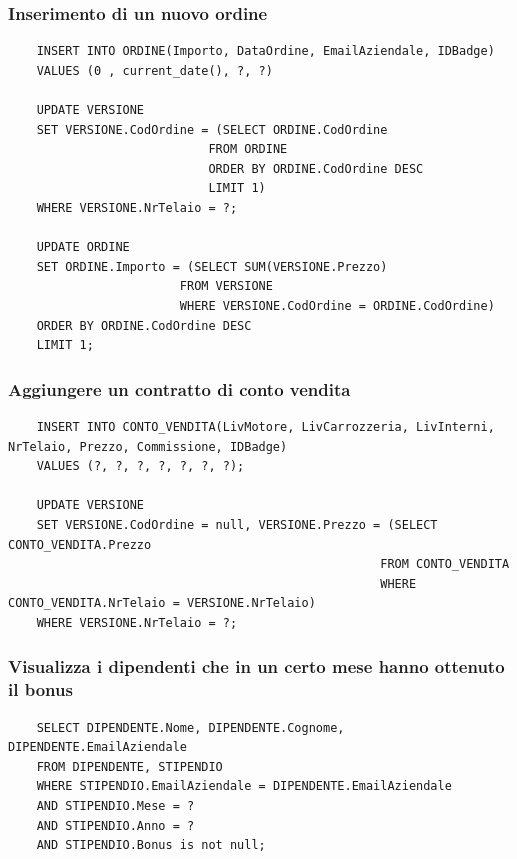 \documentclass[11pt]{article}
\begin{document}
\subsubsection*{Inserimento di un nuovo ordine}
\begin{lstlisting}
    INSERT INTO ORDINE(Importo, DataOrdine, EmailAziendale, IDBadge)
    VALUES (0 , current_date(), ?, ?)

    UPDATE VERSIONE
    SET VERSIONE.CodOrdine = (SELECT ORDINE.CodOrdine
                            FROM ORDINE
                            ORDER BY ORDINE.CodOrdine DESC 
                            LIMIT 1)
    WHERE VERSIONE.NrTelaio = ?;

    UPDATE ORDINE
    SET ORDINE.Importo = (SELECT SUM(VERSIONE.Prezzo) 
                        FROM VERSIONE 
                        WHERE VERSIONE.CodOrdine = ORDINE.CodOrdine)
    ORDER BY ORDINE.CodOrdine DESC 
    LIMIT 1;
\end{lstlisting}

\subsubsection*{Aggiungere un contratto di conto vendita}
\begin{lstlisting}
    INSERT INTO CONTO_VENDITA(LivMotore, LivCarrozzeria, LivInterni, NrTelaio, Prezzo, Commissione, IDBadge)
    VALUES (?, ?, ?, ?, ?, ?, ?);

    UPDATE VERSIONE
    SET VERSIONE.CodOrdine = null, VERSIONE.Prezzo = (SELECT CONTO_VENDITA.Prezzo 
                                                    FROM CONTO_VENDITA 
                                                    WHERE CONTO_VENDITA.NrTelaio = VERSIONE.NrTelaio) 
    WHERE VERSIONE.NrTelaio = ?;
\end{lstlisting}

\subsubsection*{Visualizza i dipendenti che in un certo mese hanno ottenuto il
bonus}

\begin{lstlisting}
    SELECT DIPENDENTE.Nome, DIPENDENTE.Cognome, DIPENDENTE.EmailAziendale
    FROM DIPENDENTE, STIPENDIO
    WHERE STIPENDIO.EmailAziendale = DIPENDENTE.EmailAziendale
    AND STIPENDIO.Mese = ?
    AND STIPENDIO.Anno = ?
    AND STIPENDIO.Bonus is not null;
\end{lstlisting}
\end{document}
